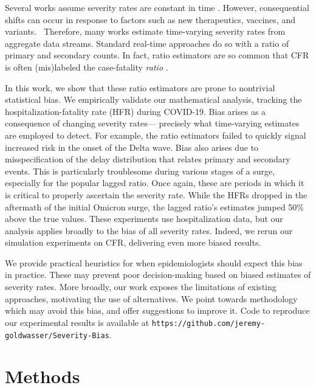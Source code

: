 \documentclass{article}
\begin{document}
Several works 
assume severity rates are constant in time \citep{nishiuraEx1, ghani, jewell2007nonparametric, reich2012estimating, lancet_controversial}. However, 
consequential shifts can occur in response to factors 
such as new therapeutics, vaccines, and variants. 
Therefore, many works estimate time-varying severity rates from aggregate data streams.
Standard real-time approaches do so with a ratio of primary and secondary counts.
In fact, ratio estimators are so common that CFR is often 
(mis)labeled the case-fatality \emph{ratio} \citep{timevar_ifr}. 

In this work, we show that these ratio estimators are prone to nontrivial
statistical bias. 
We empirically validate our mathematical analysis, 
tracking the hospitalization-fatality rate (HFR) during COVID-19.
Bias arises as a consequence of changing severity
rates---
precisely what time-varying estimates are employed to detect.
For example, the ratio estimators failed to quickly signal increased
risk in the onset of the Delta wave.
Bias also arises due to misspecification of the delay distribution that relates primary and secondary events. 
This is particularly troublesome during various stages of a surge, especially for the popular lagged ratio.
Once again, these are periods in which it is critical to properly ascertain the severity rate.
While the HFRs dropped in the aftermath of the initial Omicron surge, the lagged ratio's estimates jumped 50\% above the true values.
These experiments use hospitalization data, but our analysis applies broadly to the bias of all severity rates.
Indeed, we rerun our simulation experiments on CFR, delivering even more biased results.

We provide practical heuristics for when epidemiologists should expect this bias in practice. 
These may prevent poor decision-making based on biased estimates of severity rates. 
More broadly, our work exposes the limitations of existing approaches, motivating the use of alternatives.
We point towards methodology which may avoid this bias, and offer suggestions to improve it.
Code to reproduce our experimental results is available at \texttt{https://github.com/jeremy-goldwasser/Severity-Bias}.

\section{Methods}
\label{sec:methods}
\end{document}
